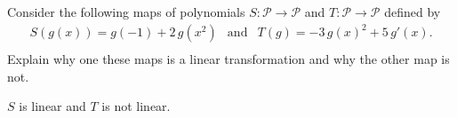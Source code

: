 
\begin{exerciseStatement}


Consider the following maps of polynomials \(S:\mathcal{P}\rightarrow\mathcal{P}\) and \(T:\mathcal{P}\rightarrow\mathcal{P}\) defined by 
\begin{align*} S(g(x))= g\left(-1\right) + 2 \, g\left(x^{2}\right)  & \text{and} & T(g)= -3 \, g\left(x\right)^{2} + 5 \, g'\left(x\right) . \\ \end{align*}
             Explain why one these maps is a linear transformation and why the other map is not. 


\end{exerciseStatement}
    
\begin{exerciseAnswer} 


\(S\) is linear and \(T\) is not linear.


\end{exerciseAnswer}
    
